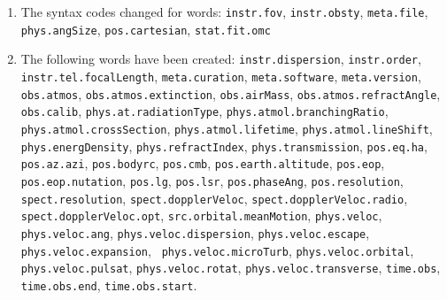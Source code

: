 \documentclass[11pt,a4paper]{ivoa}
\begin{document}
\begin{enumerate}
\item \begin{flushleft}
The syntax codes changed for words: 
{\tt instr.fov}, {\tt instr.obsty}, {\tt meta.file}, 
{\tt phys.angSize}, {\tt pos.cartesian}, {\tt stat.fit.omc}
\end{flushleft}
\item \begin{flushleft}
The following words have been created: 
{\tt instr.dispersion}, {\tt instr.order}, {\tt 
instr.tel.focalLength}, {\tt meta.curation}, {\tt meta.software}, {\tt meta.version}, {\tt 
obs.atmos}, {\tt obs.atmos.extinction}, {\tt obs.airMass}, {\tt obs.atmos.refractAngle}, 
{\tt obs.calib}, {\tt phys.at.radiationType}, {\tt phys.atmol.branchingRatio}, {\tt 
phys.atmol.crossSection}, {\tt phys.atmol.lifetime}, {\tt phys.atmol.lineShift}, {\tt 
phys.energDensity}, {\tt phys.refractIndex}, {\tt phys.transmission}, {\tt pos.eq.ha}, 
{\tt pos.az.azi}, {\tt pos.bodyrc}, {\tt pos.cmb}, {\tt pos.earth.altitude}, {\tt pos.eop}, 
{\tt pos.eop.nutation}, {\tt pos.lg}, {\tt pos.lsr}, {\tt pos.phaseAng}, {\tt pos.resolution}, 
{\tt spect.resolution}, {\tt spect.dopplerVeloc}, {\tt spect.dopplerVeloc.radio}, {\tt 
spect.dopplerVeloc.opt}, {\tt src.orbital.meanMotion}, {\tt phys.veloc}, {\tt phys.veloc.ang}, 
{\tt phys.veloc.dispersion}, {\tt phys.veloc.escape}, {\tt phys.veloc.expansion}, {\tt 
phys.veloc.microTurb}, {\tt phys.veloc.orbital}, {\tt phys.veloc.pulsat}, {\tt phys.veloc.rotat}, 
{\tt phys.veloc.transverse}, {\tt time.obs}, {\tt time.obs.end}, {\tt time.obs.start}.
\end{flushleft}
\end{enumerate}
\end{document}
